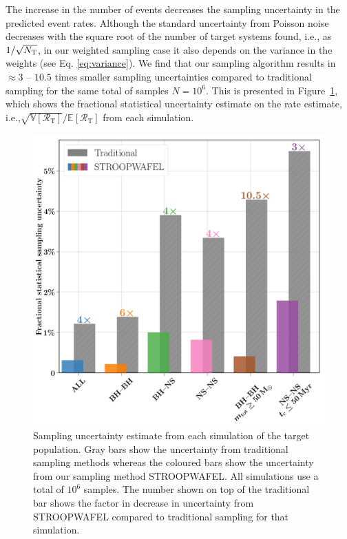 \documentclass[a4paper,fleqn,usenatbib,useAMS,usedcolumn]{mnras}
\newcommand\rate{\mathcal{R}}
\newcommand{\AISs}{\textsc{STROOPWAFEL}}
\begin{document}
The increase in the number of events  decreases the sampling uncertainty in the predicted event rates.  Although the standard uncertainty from Poisson noise decreases with the square root of the number of target systems found, i.e., as $1 / \sqrt{N_{\rm{T}}}$, in our weighted sampling case it also depends on the variance in the weights (see Eq. \ref{eq:variance}).
We find that our sampling algorithm  results in $\approx 3$ -- $10.5$ times smaller sampling uncertainties compared to traditional sampling for the same total of samples $N = 10^6$. This is presented in Figure~\ref{fig:RatesUncertainties}, which shows the fractional statistical uncertainty estimate on the rate estimate, i.e.,$\sqrt{{\mathbb{V}[\rate_{\text{T}}]}}  / {\mathbb{E}[\rate_{\text{T}}]} $  from each simulation. 
  
%
\begin{figure}
	\includegraphics[width=1\columnwidth, trim={0cm .5cm 0 0},clip]{UncertaintiesZ0_001rare.png}
    \caption{Sampling uncertainty estimate from each simulation of the target population. Gray bars show the uncertainty from traditional sampling methods whereas the coloured bars show the uncertainty from our sampling method \AISs. All simulations use a total of $10^6$ samples. The number shown on top of the traditional bar shows the factor in decrease in uncertainty from \AISs{} compared to traditional sampling for that simulation. \href{https://doi.org/10.5281/zenodo.3387651}{\color{linkcolor}\faBook}} 
    \label{fig:RatesUncertainties}
\end{figure}
%
\end{document}
